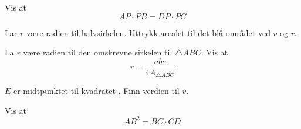 \newpage
{}
Vis at 
\[ AP\cdot PB = DP\cdot PC \]



\newpage
{}
Lar $ r $ være radien til halvsirkelen. Uttrykk arealet til det blå området ved $ v $ og $ r $.








La $ r $ være radien til den omskrevne sirkelen til $ \triangle ABC $. Vis at
\[ r=\frac{abc}{4A_{\triangle ABC}} \]







$ E $ er midtpunktet til kvadratet . Finn verdien til $ v $.

\newpage
{}
Vis at
\[ AB^2 = BC\cdot CD \]






